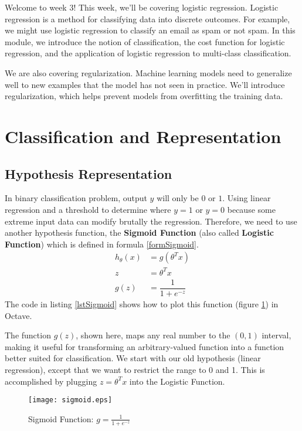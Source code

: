 Welcome to week 3! This week, we’ll be covering logistic regression. Logistic regression is a method for classifying data into discrete outcomes. For example, we might use logistic regression to classify an email as spam or not spam. In this module, we introduce the notion of classification, the cost function for logistic regression, and the application of logistic regression to multi-class classification.

We are also covering regularization. Machine learning models need to generalize well to new examples that the model has not seen in practice. We’ll introduce regularization, which helps prevent models from overfitting the training data. 

\section{Classification and Representation}
\subsection{Hypothesis Representation}
In binary classification problem, output $y$ will only be $0$ or $1$. Using linear regression and a threshold to determine where $y = 1$ or $y = 0$ because some extreme input data can modify brutally the regression. Therefore, we need to use another hypothesis function, the \textbf{Sigmoid Function} (also called \textbf{Logistic Function}) which is defined in formula \eqref{formSigmoid}.
\begin{align} \label{formSigmoid}
	h_\theta (x) 	&=  g ( \theta^T x ) \nonumber \\
	z 				&= \theta^T x \nonumber \\
	g(z) 			&= \dfrac{1}{1 + e^{-z}}
\end{align}
The code in listing \ref{lstSigmoid} shows how to plot this function (figure \ref{figSigmoid}) in Octave.

The function $g(z)$, shown here, maps any real number to the $(0, 1)$ interval, making it useful for transforming an arbitrary-valued function into a function better suited for classification. We start with our old hypothesis (linear regression), except that we want to restrict the range to 0 and 1. This is accomplished by plugging $z = \theta^Tx$ into the Logistic Function. 
\begin{figure}[!ht]
\centering
\texttt{[image: sigmoid.eps]}
\caption[Sigmoid Function]{Sigmoid Function: $g = \frac{1}{1 + e^{-z}}$}
\label{figSigmoid}
\end{figure}


